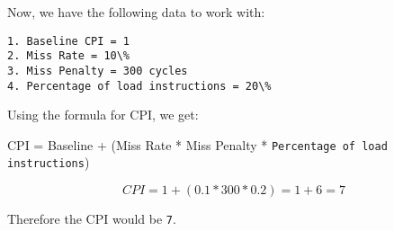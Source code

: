 \documentclass[11pt]{article}
\begin{document}
Now, we have the following data to work with:
\begin{verbatim}
1. Baseline CPI = 1
2. Miss Rate = 10\%
3. Miss Penalty = 300 cycles
4. Percentage of load instructions = 20\%
\end{verbatim}
Using the formula for CPI, we get:

CPI = Baseline + (Miss Rate * Miss Penalty * \texttt{Percentage of load instructions})

\begin{equation}
CPI = 1 + (0.1 * 300 * 0.2) = 1 + 6 = 7
\end{equation}

Therefore the CPI would be \texttt{7}.

\newpage
\end{document}
